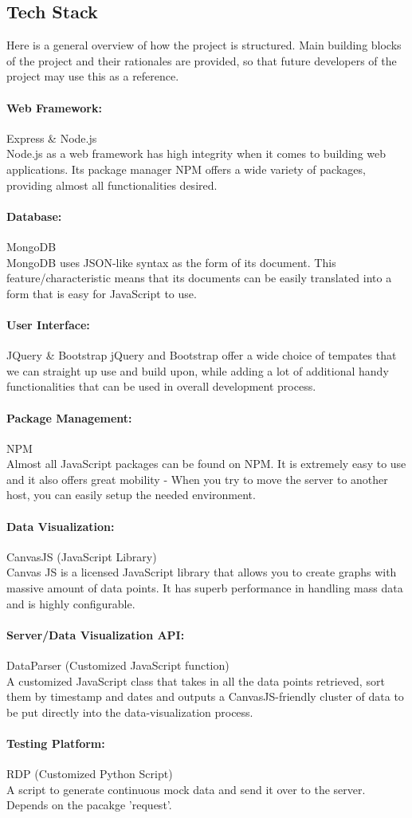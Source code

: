 \documentclass{article}
\begin{document}
\subsection{Tech Stack}
Here is a general overview of how the project is structured. Main building blocks of the project and their rationales are provided, 
so that future developers of the project may use this as a reference.
\paragraph{Web Framework:} Express \& Node.js\\
Node.js as a web framework has high integrity when it comes to building web applications. Its package manager 
NPM offers a wide variety of packages, providing almost all functionalities desired. 
\paragraph{Database:} MongoDB\\
MongoDB uses JSON-like syntax as the form of its document. This feature/characteristic means that its documents
can be easily translated into a form that is easy for JavaScript to use.
\paragraph{User Interface:} JQuery \& Bootstrap
jQuery and Bootstrap offer a wide choice of tempates that we can straight up use and build upon, while adding a lot of additional 
handy functionalities that can be used in overall development process.
\paragraph{Package Management:} NPM\\
Almost all JavaScript packages can be found on NPM. It is extremely easy to use and it also offers great mobility - When 
you try to move the server to another host, you can easily setup the needed environment.
\paragraph{Data Visualization:} CanvasJS (JavaScript Library)\\
Canvas JS is a licensed JavaScript library that allows you to create graphs with massive amount of data points. It has superb performance in 
handling mass data and is highly configurable.
\paragraph{Server/Data Visualization API: } DataParser (Customized JavaScript function)\\
A customized JavaScript class that takes in all the data points retrieved, sort them by timestamp and dates and outputs a CanvasJS-friendly
cluster of data to be put directly into the data-visualization process.
\paragraph{Testing Platform: } RDP (Customized Python Script)\\
A script to generate continuous mock data and send it over to the server. Depends on the pacakge 'request'.

\section{}
\end{document}
